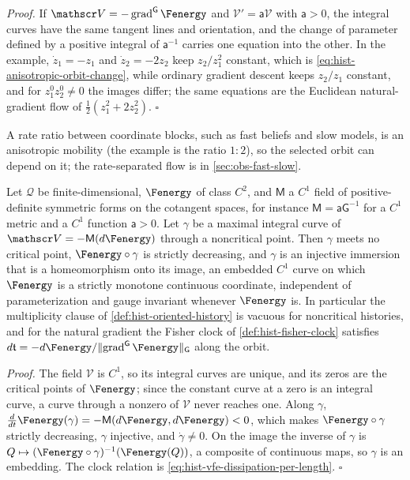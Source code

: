 \noindent\emph{Proof.}
If $\mathscr V=-\operatorname{grad}^{\mathsf G}\Fenergy$ and $\mathscr V'=\mathsf
a\mathscr V$ with $\mathsf a>0$, the integral curves have the same tangent lines and
orientation, and the change of parameter defined by a positive integral of
$\mathsf a^{-1}$ carries one equation into the other.  In the example, $\dot z_1=-z_1$
and $\dot z_2=-2z_2$ keep $z_2/z_1^2$ constant, which is
\eqref{eq:hist-anisotropic-orbit-change}, while ordinary gradient descent keeps
$z_2/z_1$ constant, and for $z_1^0z_2^0\ne0$ the images differ; the same equations are
the Euclidean natural-gradient flow of $\tfrac12(z_1^2+2z_2^2)$.  $\square$

A rate ratio between coordinate blocks, such as fast beliefs and slow models, is an
anisotropic mobility (the example is the ratio $1:2$), so the selected orbit can depend
on it; the rate-separated flow is in \cref{sec:obs-fast-slow}.

Let $\mathcal Q$ be finite-dimensional, $\Fenergy$ of class $C^2$, and $\mathsf M$ a
$C^1$ field of positive-definite symmetric forms on the cotangent spaces, for instance
$\mathsf M=\mathsf a\mathsf G^{-1}$ for a $C^1$ metric and a $C^1$ function
$\mathsf a>0$.  Let $\gamma$ be a maximal integral curve of
$\mathscr V=-\mathsf M(d\Fenergy)$ through a noncritical point.  Then $\gamma$ meets no
critical point, $\Fenergy\circ\gamma$ is strictly decreasing, and $\gamma$ is an injective
immersion that is a homeomorphism onto its image, an embedded $C^1$ curve on which
$\Fenergy$ is a strictly monotone continuous coordinate, independent of parameterization
and gauge invariant whenever $\Fenergy$ is.  In particular the multiplicity clause of
\cref{def:hist-oriented-history} is vacuous for noncritical histories, and for the
natural gradient the Fisher clock of \cref{def:hist-fisher-clock} satisfies
$d\mathfrak t=-d\Fenergy/\lVert\operatorname{grad}^{\mathsf G}\Fenergy\rVert_{\mathsf G}$
along the orbit.  

\noindent\emph{Proof.}
The field $\mathscr V$ is $C^1$, so its integral curves are unique, and its zeros are the
critical points of $\Fenergy$; since the constant curve at a zero is an integral curve, a
curve through a nonzero of $\mathscr V$ never reaches one.  Along $\gamma$,
$\tfrac{d}{dt}\Fenergy(\gamma)=-\mathsf M(d\Fenergy,d\Fenergy)<0$, which makes
$\Fenergy\circ\gamma$ strictly decreasing, $\gamma$ injective, and $\dot\gamma\ne0$.  On
the image the inverse of $\gamma$ is $Q\mapsto(\Fenergy\circ\gamma)^{-1}(\Fenergy(Q))$, a
composite of continuous maps, so $\gamma$ is an embedding.  The clock relation is
\eqref{eq:hist-vfe-dissipation-per-length}.  $\square$

